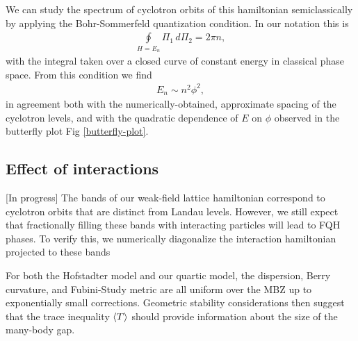 \documentclass[aps,prb,twocolumn,letterpaper,twoside,nobalancelastpage,groupedaddress,amsmath,amssymb,floatfix,citeautoscript]{revtex4-1}
\begin{document}
We can study the spectrum of cyclotron orbits of this hamiltonian semiclassically by applying the Bohr-Sommerfeld quantization condition. In our notation this is
\begin{align*}
\oint\limits_{H=E_n} \Pi_1\, d\Pi_2 = 2\pi n,
\end{align*}
with the integral taken over a closed curve of constant energy in classical phase space. From this condition we find
\begin{align*}
E_n \sim n^2\phi^2, 
\end{align*}
in agreement both with the numerically-obtained, approximate spacing of the cyclotron levels, and with the quadratic dependence of $E$ on $\phi$ observed in the butterfly plot Fig \ref{butterfly-plot}.

\subsection{Effect of interactions}
[In progress]
The bands of our weak-field lattice hamiltonian correspond to cyclotron orbits that are distinct from Landau levels. However, we still expect that fractionally filling these bands with interacting particles will lead to FQH phases. To verify this, we numerically diagonalize the interaction hamiltonian projected to these bands

For both the Hofstadter model and our quartic model, the dispersion, Berry curvature, and Fubini-Study metric are all uniform over the MBZ up to exponentially small corrections\cite{Harper:2014vi,Bauer2016}. Geometric stability considerations\cite{Jackson2015} then suggest that the trace inequality $\expval{T}$ should provide information about the size of the many-body gap.
\end{document}
